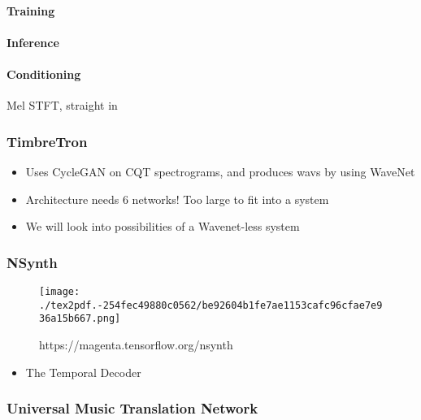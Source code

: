 \documentclass[]{article}
\providecommand{\tightlist}{%
  \setlength{\itemsep}{0pt}\setlength{\parskip}{0pt}}
\begin{document}
\paragraph{Training}

\paragraph{Inference}

\paragraph{Conditioning}

Mel STFT, straight in

\hypertarget{timbretron}{%
\subsubsection{TimbreTron}\label{timbretron}}

\begin{itemize}
\tightlist
\item
  Uses CycleGAN on CQT spectrograms, and produces wavs by using WaveNet
\item
  Architecture needs 6 networks! Too large to fit into a system
\item
  We will look into possibilities of a Wavenet-less system
\end{itemize}

\hypertarget{nsynth}{%
\subsubsection{NSynth}\label{nsynth}}

\begin{figure}
\centering
\texttt{[image: ./tex2pdf.-254fec49880c0562/be92604b1fe7ae1153cafc96cfae7e936a15b667.png]}
\caption{https://magenta.tensorflow.org/nsynth}
\end{figure}

\begin{itemize}
\tightlist
\item
  The Temporal Decoder
\end{itemize}

\hypertarget{universal-music-translation-network}{%
\subsubsection{Universal Music Translation
Network}\label{universal-music-translation-network}}
\end{document}
